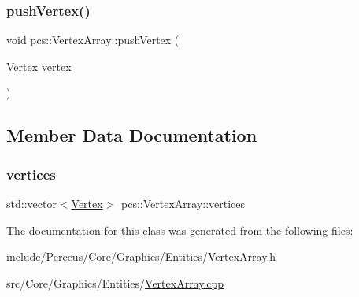 \subsubsection{\texorpdfstring{push\+Vertex()}{pushVertex()}}
{\footnotesize\ttfamily void pcs\+::\+Vertex\+Array\+::push\+Vertex (\begin{DoxyParamCaption}\item[{\hyperlink{structpcs_1_1Vertex}{Vertex}}]{vertex }\end{DoxyParamCaption})\hspace{0.3cm}{\ttfamily [inline]}}



\subsection{Member Data Documentation}
\mbox{\label{classpcs_1_1VertexArray_a2390569dd7f4fd19abbc13cbdc641232}} 
\subsubsection{\texorpdfstring{vertices}{vertices}}
{\footnotesize\ttfamily std\+::vector$<$\hyperlink{structpcs_1_1Vertex}{Vertex}$>$ pcs\+::\+Vertex\+Array\+::vertices\hspace{0.3cm}{\ttfamily [private]}}



The documentation for this class was generated from the following files\+:\begin{DoxyCompactItemize}
\item 
include/\+Perceus/\+Core/\+Graphics/\+Entities/\hyperlink{VertexArray_8h}{Vertex\+Array.\+h}\item 
src/\+Core/\+Graphics/\+Entities/\hyperlink{VertexArray_8cpp}{Vertex\+Array.\+cpp}\end{DoxyCompactItemize}
